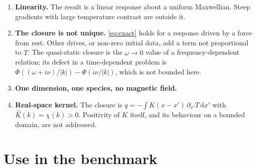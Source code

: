 \documentclass[11pt]{article}
\newcommand{\dd}{\mathrm{d}}
\newcommand{\He}{\mathrm{He}}
\newcommand{\avg}[1]{\langle #1\rangle}
\theoremstyle{remark}
\begin{document}
\begin{enumerate}
    A rough estimate shows the size of the effect. Iterating
    $h\mapsto-(v/\nu)\,\partial_xh$ on the temperature gradient and ignoring
    the conservation corrections gives a relative correction to Fourier's
    law of $-(k/\nu)^2\,\avg{\He_3v^3\He_2}/\avg{\He_3v\He_2} = -9\,(k/\nu)^2$
    for constant $\nu$, to be compared with the exact $-4\,(k/\nu)^2$. The
    same estimate with $\nu(v) = \nu_0|v|^{-3}$ replaces each factor $v$ by
    $v|v|^3$ and gives
    \[
      \frac{\avg{|v|^{17}-4|v|^{15}+3|v|^{13}}}
           {\avg{|v|^{9}-4|v|^{7}+3|v|^{5}}}\,
      \Bigl(\frac{k}{\nu_0}\Bigr)^2
      \approx 3.6\times10^4\,\Bigl(\frac{k}{\nu_0}\Bigr)^2 ,
    \]
    which reaches order one at $k/\nu_0\approx5\times10^{-3}$, where
    $1/\nu_0$ is the mean free path at the thermal speed. This is a
    heuristic, not a theorem, and it is good to a factor of a few at best;
    but it puts the breakdown of the local closure two orders of magnitude
    earlier in $k\lambda$ than in the constant-$\nu$ model. The
    nonlocal-transport literature attributes the failure of Spitzer--H\"arm
    at Knudsen numbers near $10^{-2}$ to exactly this: heat is carried by
    electrons near four times the thermal speed, whose mean free path is
    more than a hundred times the thermal one \cite{Brodrick}.
  \item \textbf{Linearity.} The result is a linear response about a uniform
    Maxwellian. Steep gradients with large temperature contrast are outside
    it.
  \item \textbf{The closure is not unique.} \eqref{eq:exact} holds for a
    response driven by a force from rest. Other drives, or non-zero initial
    data, add a term not proportional to $\hat T$. The quasi-static closure
    is the $\omega\to0$ value of a frequency-dependent relation; its defect
    in a time-dependent problem is $\Phi((\omega+i\nu)/|k|)-\Phi(i\nu/|k|)$,
    which is not bounded here.
  \item \textbf{One dimension, one species, no magnetic field.}
  \item \textbf{Real-space kernel.} The closure is
    $q = -\int K(x-x')\,\partial_{x'}T\,\dd x'$ with
    $\hat K(k) = \chi(k) > 0$. Positivity of $K$ itself, and its behaviour
    on a bounded domain, are not addressed.
\end{enumerate}

\section{Use in the benchmark}
\end{document}
